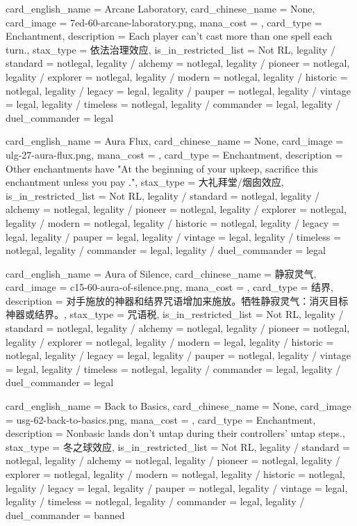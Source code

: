 \documentclass[lang = cn, color = black, 10pt]{AllThatStax}
\begin{document}
\card
{
	card_english_name = {Arcane Laboratory},
	card_chinese_name = {None},
	card_image = 7ed-60-arcane-laboratory.png,
	mana_cost = ,
	card_type = Enchantment,
	description = {Each player can't cast more than one spell each turn.},
	stax_type = 依法治理效应,
	is_in_restricted_list = Not RL,
	legality / standard = notlegal,
	legality / alchemy = notlegal,
	legality / pioneer = notlegal,
	legality / explorer = notlegal,
	legality / modern = notlegal,
	legality / historic = notlegal,
	legality / legacy = legal,
	legality / pauper = notlegal,
	legality / vintage = legal,
	legality / timeless = notlegal,
	legality / commander = legal,
	legality / duel_commander = legal
}

\card
{
	card_english_name = {Aura Flux},
	card_chinese_name = {None},
	card_image = ulg-27-aura-flux.png,
	mana_cost = ,
	card_type = Enchantment,
	description = {Other enchantments have "At the beginning of your upkeep, sacrifice this enchantment unless you pay ."},
	stax_type = 大礼拜堂/烟囱效应,
	is_in_restricted_list = Not RL,
	legality / standard = notlegal,
	legality / alchemy = notlegal,
	legality / pioneer = notlegal,
	legality / explorer = notlegal,
	legality / modern = notlegal,
	legality / historic = notlegal,
	legality / legacy = legal,
	legality / pauper = legal,
	legality / vintage = legal,
	legality / timeless = notlegal,
	legality / commander = legal,
	legality / duel_commander = legal
}

\card
{
	card_english_name = {Aura of Silence},
	card_chinese_name = {静寂灵气},
	card_image = c15-60-aura-of-silence.png,
	mana_cost = ,
	card_type = 结界,
	description = {对手施放的神器和结界咒语增加来施放。牺牲静寂灵气：消灭目标神器或结界。},
	stax_type = 咒语税,
	is_in_restricted_list = Not RL,
	legality / standard = notlegal,
	legality / alchemy = notlegal,
	legality / pioneer = notlegal,
	legality / explorer = notlegal,
	legality / modern = legal,
	legality / historic = notlegal,
	legality / legacy = legal,
	legality / pauper = notlegal,
	legality / vintage = legal,
	legality / timeless = notlegal,
	legality / commander = legal,
	legality / duel_commander = legal
}

\card
{
	card_english_name = {Back to Basics},
	card_chinese_name = {None},
	card_image = usg-62-back-to-basics.png,
	mana_cost = ,
	card_type = Enchantment,
	description = {Nonbasic lands don't untap during their controllers' untap steps.},
	stax_type = 冬之球效应,
	is_in_restricted_list = Not RL,
	legality / standard = notlegal,
	legality / alchemy = notlegal,
	legality / pioneer = notlegal,
	legality / explorer = notlegal,
	legality / modern = notlegal,
	legality / historic = notlegal,
	legality / legacy = legal,
	legality / pauper = notlegal,
	legality / vintage = legal,
	legality / timeless = notlegal,
	legality / commander = legal,
	legality / duel_commander = banned
}
\end{document}
